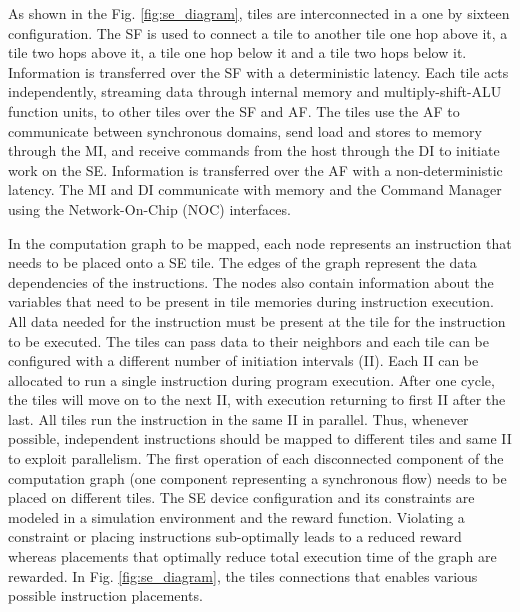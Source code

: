 As shown in the Fig. \ref{fig:se_diagram}, tiles are interconnected in a one by sixteen configuration.
The SF is used to connect a tile to another tile one hop above it, a tile two hops above it, a tile one hop below it and a tile two hops below it.
Information is transferred over the SF with a deterministic latency. 
Each tile acts independently, streaming data through internal memory and multiply-shift-ALU function units, to other tiles over the SF and AF.
The tiles use the AF to communicate between synchronous domains, send load and stores to memory through the MI, and receive commands from the host through the DI to initiate work on the SE.
Information is transferred over the AF with a non-deterministic latency.
The MI and DI communicate with memory and the Command Manager using the Network-On-Chip (NOC) interfaces.

In the computation graph to be mapped, each node represents an instruction that needs to be placed onto a SE tile. 
The edges of the graph represent the data dependencies of the instructions. 
The nodes also contain information about the variables that need to be present in tile memories during instruction execution. 
All data needed for the instruction must be present at the tile for the instruction to be executed. 
The tiles can pass data to their neighbors and each tile can be configured with a different number of initiation intervals (II). 
Each II can be allocated to run a single instruction during program execution. 
After one cycle, the tiles will move on to the next II, with execution returning to first II after the last. 
All tiles run the instruction in the same II in parallel. 
Thus, whenever possible, independent instructions should be mapped to different tiles and same II to exploit parallelism. 
The first operation of each disconnected component of the computation graph (one component representing a synchronous flow) 
needs to be placed on different tiles. 
The SE device configuration and its constraints are modeled in a simulation environment and the reward function. 
Violating a constraint or placing instructions sub-optimally leads to a reduced reward whereas placements that optimally 
reduce total execution time of the graph are rewarded. 
In Fig. \ref{fig:se_diagram}, the tiles connections that enables various possible instruction placements.